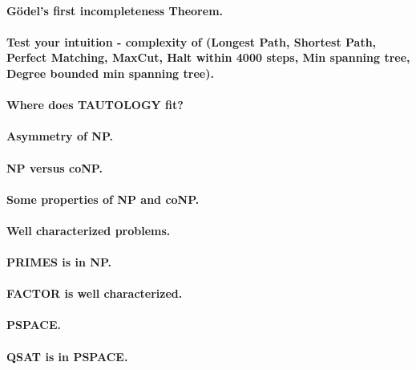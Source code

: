 \documentclass[11pt,a4paper]{article}
\theoremstyle{definition}
\begin{document}
\paragraph{Gödel's first incompleteness Theorem.}

\paragraph{Test your intuition - complexity of (Longest Path, Shortest Path, Perfect Matching, MaxCut, Halt within 4000 steps, Min spanning tree, Degree bounded min spanning tree).}

\paragraph{Where does TAUTOLOGY fit?}

\paragraph{Asymmetry of NP.}

\paragraph{NP versus coNP.}

\paragraph{Some properties of NP and coNP.}

\paragraph{Well characterized problems.}

\paragraph{PRIMES is in NP.}

\paragraph{FACTOR is well characterized.}

\paragraph{PSPACE.}

\paragraph{QSAT is in PSPACE.}
\end{document}
